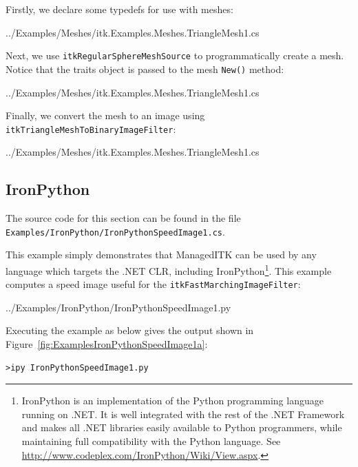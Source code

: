 \documentclass{InsightArticle}
\def\code#1{\texttt{#1}}
\begin{document}
Firstly, we declare some typedefs for use with meshes:
\begin{center}
	
	{../Examples/Meshes/itk.Examples.Meshes.TriangleMesh1.cs}
\end{center}

Next, we use \code{itkRegularSphereMeshSource} to programmatically create a mesh.
Notice that the traits object is passed to the mesh \code{New()} method:
\begin{center}
	
	{../Examples/Meshes/itk.Examples.Meshes.TriangleMesh1.cs}
\end{center}

Finally, we convert the mesh to an image using
\code{itkTriangleMeshToBinaryImageFilter}:
\begin{center}
	
	{../Examples/Meshes/itk.Examples.Meshes.TriangleMesh1.cs}
\end{center}

\subsection{IronPython}
The source code for this section can be found in the file\\
\code{Examples/IronPython/IronPythonSpeedImage1.cs}.

This example simply demonstrates that ManagedITK can be used
by any language which targets the .NET CLR, including IronPython\footnote{IronPython is an implementation of the Python programming language running on .NET. It is well integrated with the rest of the .NET Framework and makes all .NET libraries easily available to Python programmers, while maintaining full compatibility with the Python language. See
\href{http://www.codeplex.com/IronPython/Wiki/View.aspx}{http://www.codeplex.com/IronPython/Wiki/View.aspx}.}. 
This example computes a speed image useful for the \code{itkFastMarchingImageFilter}:

\begin{center}
	
	{../Examples/IronPython/IronPythonSpeedImage1.py}
\end{center}

Executing the example as below gives the output shown in Figure~\ref{fig:ExamplesIronPythonSpeedImage1a}:

\begin{lstlisting}
>ipy IronPythonSpeedImage1.py
\end{lstlisting}
\end{document}
